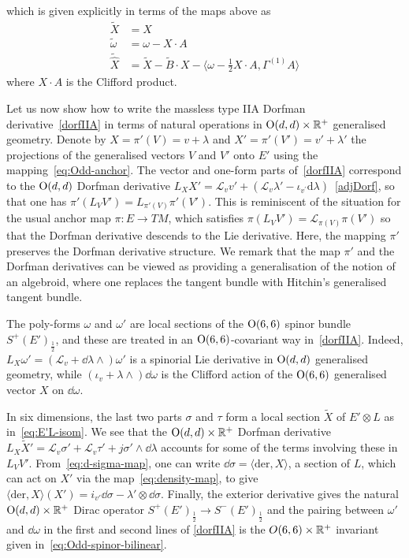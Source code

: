 \documentclass[debug]{phd}
\begin{document}
			which is given explicitly in terms of the maps above as
					\begin{equation}\label{eq:Odd-twist}
						\begin{aligned}
							\tilde{X} &= X \\
							\tilde{\omega} &= \omega - X \cdot A \\
							\tilde{\hat{X}} &= \tilde{X} - \tilde{B} \cdot X - \langle \omega - \tfrac12 X \cdot A, \Gamma^{(1)} A \rangle
						\end{aligned}
					\end{equation}
			where $X\cdot A$ is the Clifford product. 

			Let us now show how to write the massless type IIA Dorfman derivative~\eqref{dorfIIA} in terms of natural operations in $\mathrm{O}(d,d)\times\mathbb{R}^+$ generalised geometry. 
			Denote by $X = \pi' (V) = v + \lambda$ and $X' = \pi'(V') = v' + \lambda'$ the projections of the generalised vectors $V$ and $V'$ onto $E'$ using the mapping~\eqref{eq:Odd-anchor}. 
			The vector and one-form parts of~\eqref{dorfIIA} correspond to the $\mathrm{O}(d,d)$ Dorfman derivative $L_X X' = \mathcal{L}_v v' + \left(\mathcal{L}_v \lambda' - \iota_{v^\prime} \mathrm{d}\lambda\right)$~\eqref{adjDorf}, so that one has $\pi' (L_V V') = L_{\pi' (V)} \pi' (V')$. 
			This is reminiscent of the situation for the usual anchor map $\pi : E \rightarrow TM$, which satisfies $\pi (L_V V') = \mathcal{L}_{\pi(V)} \pi(V')$ so that the Dorfman derivative descends to the Lie derivative. 
			Here, the mapping $\pi'$ preserves the Dorfman derivative structure. 
			We remark that the map $\pi'$ and the Dorfman derivatives can be viewed as providing a generalisation of the notion of an algebroid, where one replaces the tangent bundle with Hitchin's generalised tangent bundle.

			The poly-forms $\omega$ and $\omega'$ are local sections of the $\mathrm{O}(6,6)$ spinor bundle $S^+(E')_{\frac{1}{2}}$, and these are treated in an $\mathrm{O}(6,6)$-covariant way in~\eqref{dorfIIA}. 
			Indeed, $L_X \omega' = (\mathcal{L}_v + \dd \lambda \wedge)\omega'$ is a spinorial Lie derivative in $\mathrm{O}(d,d)$ generalised geometry, while $(\iota_v + \lambda\wedge)\dd\omega$ is the Clifford action of the $\mathrm{O}(6,6)$ generalised vector $X$ on $\dd \omega$. 

			In six dimensions, the last two parts $\sigma$ and $\tau$ form a local section $\tilde{X}$ of $E' \otimes L$ as in~\eqref{eq:E'L-isom}. 
			We see that the $\mathrm{O}(d,d)\times\mathbb{R}^+$ Dorfman derivative $L_X \tilde{X}' = \mathcal{L}_v \sigma' + \mathcal{L}_v \tau' + j \sigma' \wedge \dd \lambda$ accounts for some of the terms involving these in $L_V V'$. 	
			From~\eqref{eq:d-sigma-map}, one can write $\dd \sigma = \langle \mathrm{der} , X \rangle$, a section of $L$, which can act on $X'$ via the map~\eqref{eq:density-map}, to give $\langle \mathrm{der} , X \rangle (X') = i_{v'} \dd \sigma - \lambda'\otimes\dd\sigma$. 
			Finally, the exterior derivative gives the natural $\mathrm{O}(d,d)\times\mathbb{R}^+$ Dirac operator $S^+(E')_{\frac{1}{2}} \rightarrow S^-(E')_{\frac{1}{2}}$ and the pairing between $\omega'$ and $\dd\omega$ in the first and second lines of \eqref{dorfIIA} is the $O(6,6)\times\mathbb{R}^+$ invariant given in~\eqref{eq:Odd-spinor-bilinear}.
\end{document}
